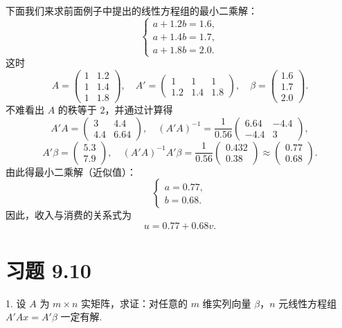 \documentclass[UTF8,12pt,a4paper,fontset=fandol]{ctexart}
\begin{document}
下面我们来求前面例子中提出的线性方程组的最小二乘解：
\[
  \begin{cases}
    a+1.2b=1.6,\\
    a+1.4b=1.7,\\
    a+1.8b=2.0.
  \end{cases}
\]
这时
\[
  A=
  \left(\begin{array}{cc}
    1 & 1.2\\
    1 & 1.4\\
    1 & 1.8
  \end{array}\right),\quad
  A'=
  \left(\begin{array}{ccc}
    1 & 1 & 1\\
    1.2 & 1.4 & 1.8
  \end{array}\right),\quad
  \beta=
  \left(\begin{array}{c}
    1.6\\ 1.7\\ 2.0
  \end{array}\right).
\]
不难看出 $A$ 的秩等于 $2$，并通过计算得
\[
  A'A=
  \left(\begin{array}{cc}
    3 & 4.4\\
    4.4 & 6.64
  \end{array}\right),\quad
  (A'A)^{-1}=\frac1{0.56}
  \left(\begin{array}{rr}
    6.64 & -4.4\\
    -4.4 & 3
  \end{array}\right),
\]
\[
  A'\beta=
  \left(\begin{array}{c}
    5.3\\
    7.9
  \end{array}\right),\quad
  (A'A)^{-1}A'\beta=\frac1{0.56}
  \left(\begin{array}{c}
    0.432\\
    0.38
  \end{array}\right)
  \approx
  \left(\begin{array}{c}
    0.77\\
    0.68
  \end{array}\right).
\]
由此得最小二乘解（近似值）：
\[
  \begin{cases}
    a=0.77,\\
    b=0.68.
  \end{cases}
\]
因此，收入与消费的关系式为
\[
  u=0.77+0.68v.
\]

\section*{习题 9.10}

1. 设 $A$ 为 $m\times n$ 实矩阵，求证：对任意的 $m$ 维实列向量 $\beta$，$n$ 元线性方程组 $A'Ax=A'\beta$ 一定有解.
\end{document}
